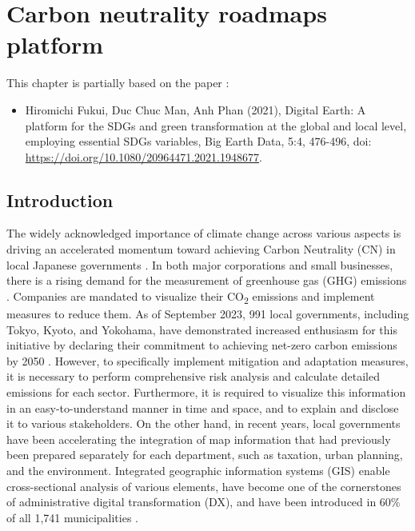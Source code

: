 \chapter{Carbon neutrality roadmaps platform} \label{chap5}
\renewcommand{\headrulewidth}{0pt}
\lhead[\thepage]{\leftmark}
\rhead[\leftmark]{\thepage}
\cfoot[]{}

This chapter is partially based on the paper \citep{fukui2021digital}:
\begin{itemize}
    \item Hiromichi Fukui, Duc Chuc Man, Anh Phan (2021), Digital Earth: A platform for the SDGs and green transformation at the global and local level, employing essential SDGs variables, Big Earth Data, 5:4, 476-496, doi: \url{https://doi.org/10.1080/20964471.2021.1948677}.
\end{itemize}

\section{Introduction}

The widely acknowledged importance of climate change across various aspects \citep{primack2009impact, watanabe2009general, ogawa2013ecological, shibuya2016effect} is driving an accelerated momentum toward achieving Carbon Neutrality (CN) in local Japanese governments \citep{nakazawa2023net}. In both major corporations and small businesses, there is a rising demand for the measurement of greenhouse gas (GHG) emissions \citep{kauffmann2012corporate}. Companies are mandated to visualize their CO\textsubscript{2} emissions and implement measures to reduce them. As of September 2023, 991 local governments, including Tokyo, Kyoto, and Yokohama, have demonstrated increased enthusiasm for this initiative by declaring their commitment to achieving net-zero carbon emissions by 2050 \citep{zerocarboncities}. However, to specifically implement mitigation and adaptation measures, it is necessary to perform comprehensive risk analysis and calculate detailed emissions for each sector. Furthermore, it is required to visualize this information in an easy-to-understand manner in time and space, and to explain and disclose it to various stakeholders. On the other hand, in recent years, local governments have been accelerating the integration of map information that had previously been prepared separately for each department, such as taxation, urban planning, and the environment. Integrated geographic information systems (GIS) enable cross-sectional analysis of various elements, have become one of the cornerstones of administrative digital transformation (DX), and have been introduced in 60\% of all 1,741 municipalities \citep{nikkei}.\par

